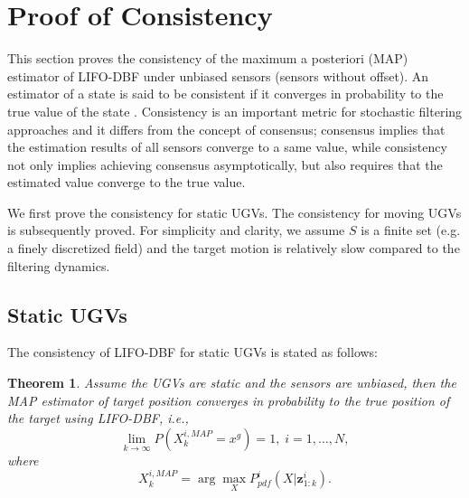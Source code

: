 \documentclass[journal]{IEEEtranTIE}
\newtheorem{thm}{\bfseries Theorem}
\theoremstyle{remark}
\newcommand{\X}{X}
\newcommand{\xg}{x^g}
\begin{document}
	\section{Proof of Consistency}\label{sec:consist_proof} %
	This section proves the consistency of the maximum a posteriori (MAP) estimator of LIFO-DBF under unbiased sensors (sensors without offset).
	An estimator of a state is said to be consistent if it converges in probability to the true value of the state \cite{amemiya1985advanced}.
	Consistency is an important metric for stochastic filtering approaches \cite{chen2003bayesian} and it differs from the concept of consensus; consensus implies that the estimation results of all sensors converge to a same value, while consistency not only implies achieving consensus asymptotically, but also requires that the estimated value converge to the true value. 
	
	We first prove the consistency for static UGVs.
	The consistency for moving UGVs is subsequently proved.
	For simplicity and clarity, we assume $S$ is a finite set (e.g. a finely discretized field) and the
	target motion is relatively slow compared to the filtering dynamics. 
	
	\subsection{Static UGVs}
	The consistency of LIFO-DBF for static UGVs is stated as follows: 
	\begin{thm}\label{thm:LIFO-dbf-sta-tar}
		Assume the UGVs are static and the sensors are unbiased, then the MAP estimator of target position converges in probability to the true position of the target using LIFO-DBF, i.e.,
		\small\begin{equation*}
			\lim\limits_{k\rightarrow \infty}
			P(\X^{i,MAP}_k=\xg)=
			1,\;i=1,\dots,N,
		\end{equation*}\normalsize
		where 
		\small\begin{equation*}
			\X^{i,MAP}_k=\arg\max\limits_{\X}P^i_{pdf}(\X|\mathbf{z}^{i}_{1:k}).
		\end{equation*}
	\end{thm}
	
\end{document}
